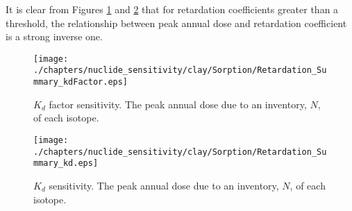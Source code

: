 It is clear from Figures \ref{fig:KdSumFactor} and \ref{fig:KdSum} that 
for retardation coefficients greater than a threshold, the 
relationship between peak annual dose and retardation coefficient is a strong 
inverse one. 

\begin{figure}[ht]
\centering
\texttt{[image: ./chapters/nuclide\_sensitivity/clay/Sorption/Retardation\_Summary\_kdFactor.eps]}
\caption{$K_d$ factor sensitivity.  The peak annual dose due to an inventory, 
$N$, of each isotope.}
\label{fig:KdSumFactor}
\end{figure}

\begin{figure}[ht]
\centering
\texttt{[image: ./chapters/nuclide\_sensitivity/clay/Sorption/Retardation\_Summary\_kd.eps]}
\caption{$K_d$ sensitivity.  The peak annual dose due to an inventory, 
$N$, of each isotope.}
\label{fig:KdSum}
\end{figure}

\clearpage
